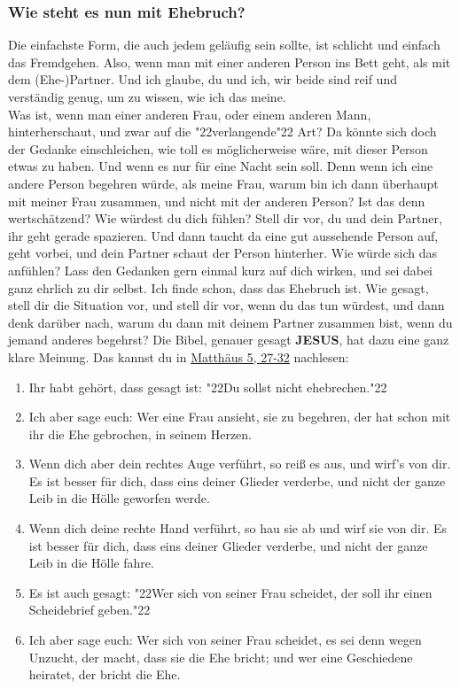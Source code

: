 \documentclass[10pt,a5paper]{article}
\newcommand{\Jesus}[0]{\textbf{JESUS}}
\newcommand{\q}[1]{\char"22{#1}\char"22 }
\begin{document}
	\subsubsection{Wie steht es nun mit Ehebruch?}
		Die einfachste Form,
		die auch jedem gel\"aufig sein sollte,
		ist schlicht und einfach das Fremdgehen.
		Also,
		wenn man mit einer anderen Person ins Bett geht,
		als mit dem (Ehe-)Partner.
		Und ich glaube,
		du und ich,
		wir beide sind reif und verst\"andig genug,
		um zu wissen,
		wie ich das meine.
		\\
		Was ist,
		wenn man einer anderen Frau,
		oder einem anderen Mann,
		hinterherschaut,
		und zwar auf die \q{verlangende} Art?
		Da k\"onnte sich doch der Gedanke einschleichen,
		wie toll es m\"oglicherweise w\"are,
		mit dieser Person etwas zu haben.
		Und wenn es nur f\"ur eine Nacht sein soll.
		Denn wenn ich eine andere Person begehren w\"urde,
		als meine Frau,
		warum bin ich dann \"uberhaupt mit meiner Frau zusammen,
		und nicht mit der anderen Person?
		Ist das denn wertsch\"atzend?
		Wie w\"urdest du dich f\"uhlen?
		Stell dir vor,
		du und dein Partner,
		ihr geht gerade spazieren.
		Und dann taucht da eine gut aussehende Person auf,
		geht vorbei,
		und dein Partner schaut der Person hinterher.
		Wie w\"urde sich das anf\"uhlen?
		Lass den Gedanken gern einmal kurz auf dich wirken,
		und sei dabei ganz ehrlich zu dir selbst.
		Ich finde schon,
		dass das Ehebruch ist.
		Wie gesagt,
		stell dir die Situation vor,
		und stell dir vor,
		wenn du das tun w\"urdest,
		und dann denk dar\"uber nach,
		warum du dann mit deinem Partner zusammen bist,
		wenn du jemand anderes begehrst?
		Die Bibel,
		genauer gesagt {\Jesus},
		hat dazu eine ganz klare Meinung.
		Das kannst du in \href{https://www.die-bibel.de/bibeln/online-bibeln/lesen/LU17/MAT.5/Matthäus-5}{Matth\"aus 5, 27-32} nachlesen:
		\begin{enumerate}[noitemsep,start=27]
			\item	Ihr habt geh\"ort,
					dass gesagt ist:
					\q{Du sollst nicht ehebrechen.}
			\item	Ich aber sage euch:
					Wer eine Frau ansieht,
					sie zu begehren,
					der hat schon mit ihr die Ehe gebrochen,
					in seinem Herzen.
			\item	Wenn dich aber dein rechtes Auge verf\"uhrt,
					so rei{\ss} es aus,
					und wirf's von dir.
					Es ist besser f\"ur dich,
					dass eins deiner Glieder verderbe,
					und nicht der ganze Leib in die H\"olle geworfen werde.
			\item	Wenn dich deine rechte Hand verf\"uhrt,
					so hau sie ab und wirf sie von dir.
					Es ist besser für dich,
					dass eins deiner Glieder verderbe,
					und nicht der ganze Leib in die H\"olle fahre.
			\item	Es ist auch gesagt:
					\q{Wer sich von seiner Frau scheidet,
					der soll ihr einen Scheidebrief geben.}
			\item	Ich aber sage euch:
					Wer sich von seiner Frau scheidet,
					es sei denn wegen Unzucht,
					der macht,
					dass sie die Ehe bricht;
					und wer eine Geschiedene heiratet,
					der bricht die Ehe.
		\end{enumerate}
	
\end{document}
